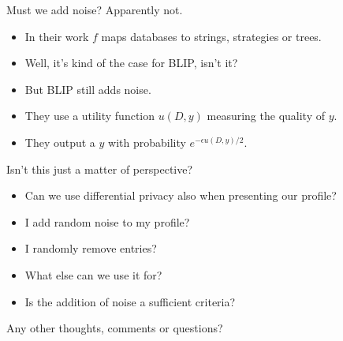 \begin{frame}
  \begin{question}
    Must we add noise?
    Apparently not.
  \end{question}

  \pause{}

  \begin{example}
    \begin{itemize}
      \item In their work \(f\) maps databases to strings, strategies or trees.

        \pause{}

      \item Well, it's kind of the case for BLIP, isn't it?
      \item But BLIP still adds noise.

        \pause{}

      \item They use a utility function \(u(D, y)\) measuring the quality of 
        \(y\).

      \item They output a \(y\) with probability \(e^{-\epsilon u(D,y)/2}\).
    \end{itemize}
  \end{example}

  \pause{}

  \begin{question}
    Isn't this just a matter of perspective?
  \end{question}
\end{frame}

\begin{frame}
  \begin{question}
    \begin{itemize}
      \item Can we use differential privacy also when presenting our profile?
      \item I add random noise to my profile?
      \item I randomly remove entries?
    \end{itemize}
  \end{question}

  \pause{}

  \begin{question}
    \begin{itemize}
      \item What else can we use it for?
      \item Is the addition of noise a sufficient criteria?
    \end{itemize}
  \end{question}
\end{frame}

\begin{frame}
  \begin{question}
    Any other thoughts, comments or questions?
  \end{question}
\end{frame}



\begin{frame}[allowframebreaks]
  \printbibliography{}
\end{frame}

